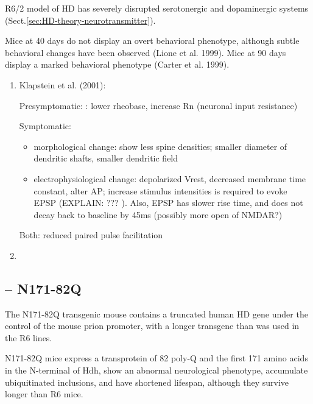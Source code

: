 R6/2 model of HD has severely disrupted serotonergic and dopaminergic systems
(Sect.\ref{sec:HD-theory-neurotransmitter}).



Mice at 40 days do not display an overt behavioral phenotype, although subtle
behavioral changes have been observed (Lione et al. 1999). Mice at 90 days
display a marked behavioral phenotype (Carter et al. 1999).

\begin{enumerate}
  \item Klapstein et al. (2001): 
 
Presymptomatic: : lower rheobase, increase Rn (neuronal input resistance)

Symptomatic:
\begin{itemize}
  \item  morphological change: show less spine densities; smaller
  diameter of dendritic shafts, smaller dendritic field
  
  \item electrophysiological change: depolarized Vrest, decreased membrane time
  constant, alter AP; increase stimulus intensities is required to evoke EPSP
  (EXPLAIN: ??? ). Also, EPSP has slower rise time, and does not decay back to
  baseline by 45ms (possibly more open of NMDAR?)
  
\end{itemize}

Both: reduced paired pulse facilitation
   
  \item 
\end{enumerate}

\subsection{-- N171-82Q}
\label{sec:mouse-N171-82Q}


The N171-82Q transgenic mouse contains a truncated human HD gene under the
control of the mouse prion promoter, with a longer transgene than was used in
the R6 lines.

N171-82Q mice express a transprotein of 82 poly-Q and the first 171 amino acids
in the N-terminal of Hdh, show an abnormal neurological phenotype, accumulate
ubiquitinated inclusions, and have shortened lifespan, although they survive
longer than R6 mice.

